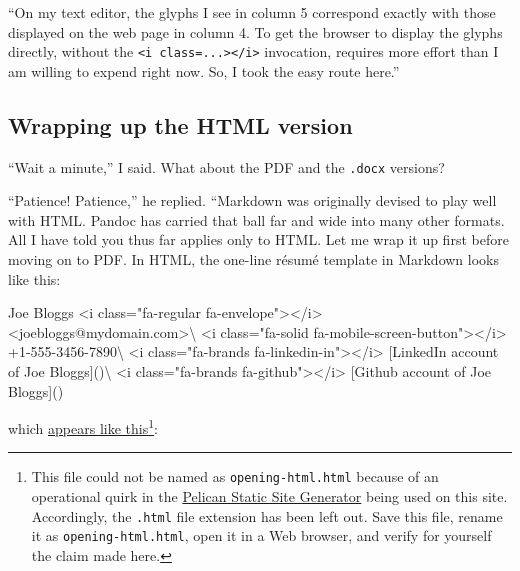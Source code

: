 \documentclass[
  british,
  a4paper,
  rgb,
  dvipsnames,
  svgnames,
  hyphens]{article}
\newenvironment{Shaded}{\begin{snugshade}}{\end{snugshade}}
\newcommand{\ErrorTok}[1]{\textcolor[rgb]{0.76,0.75,0.62}{#1}}
\newcommand{\KeywordTok}[1]{\textcolor[rgb]{0.94,0.87,0.69}{#1}}
\newcommand{\NormalTok}[1]{\textcolor[rgb]{0.80,0.80,0.80}{#1}}
\newcommand{\OtherTok}[1]{\textcolor[rgb]{0.94,0.94,0.56}{#1}}
\newcommand{\StringTok}[1]{\textcolor[rgb]{0.80,0.58,0.58}{#1}}
\begin{document}
``On my text editor, the glyphs I see in column 5 correspond exactly
with those displayed on the web page in column 4. To get the browser to
display the glyphs directly, without the
\texttt{\textless{}i\ class=...\textgreater{}\textless{}/i\textgreater{}}
invocation, requires more effort than I am willing to expend right now.
So, I took the easy route here.''  \normalfont

\hypertarget{wrapping-up-the-html-version}{%
\subsection{Wrapping up the HTML
version}\label{wrapping-up-the-html-version}}

``Wait a minute,'' I said. What about the PDF and the \texttt{.docx}
versions?

``Patience! Patience,'' he replied. ``Markdown was originally devised to
play well with HTML. Pandoc has carried that ball far and wide into many
other formats. All I have told you thus far applies only to HTML. Let me
wrap it up first before moving on to PDF. In HTML, the one-line résumé
template in Markdown looks like this:

\begin{Shaded}
\begin{Highlighting}[]
\NormalTok{Joe Bloggs}
\KeywordTok{\textless{}i} \ErrorTok{class}\OtherTok{=}\StringTok{"fa{-}regular fa{-}envelope"}\KeywordTok{\textgreater{}\textless{}/i\textgreater{}} \KeywordTok{\textless{}joebloggs}\ErrorTok{@mydomain.com}\KeywordTok{\textgreater{}}\NormalTok{\textbackslash{}}
\KeywordTok{\textless{}i} \ErrorTok{class}\OtherTok{=}\StringTok{"fa{-}solid fa{-}mobile{-}screen{-}button"}\KeywordTok{\textgreater{}\textless{}/i\textgreater{}}\NormalTok{ +1{-}555{-}3456{-}7890\textbackslash{}}
\KeywordTok{\textless{}i} \ErrorTok{class}\OtherTok{=}\StringTok{"fa{-}brands fa{-}linkedin{-}in"}\KeywordTok{\textgreater{}\textless{}/i\textgreater{}}\NormalTok{ [LinkedIn account of Joe Bloggs]()\textbackslash{}}
\KeywordTok{\textless{}i} \ErrorTok{class}\OtherTok{=}\StringTok{"fa{-}brands fa{-}github"}\KeywordTok{\textgreater{}\textless{}/i\textgreater{}}\NormalTok{ [Github account of Joe Bloggs]()}
\end{Highlighting}
\end{Shaded}

which \href{auxiliary/opening-html}{appears like this}\footnote{This
  file could not be named as \texttt{opening-html.html} because of an
  operational quirk in the \href{https://blog.getpelican.com/}{Pelican
  Static Site Generator} being used on this site. Accordingly, the
  \texttt{.html} file extension has been left out. Save this file,
  rename it as \texttt{opening-html.html}, open it in a Web browser, and
  verify for yourself the claim made here.}:
\end{document}
